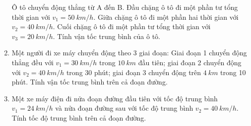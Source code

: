 \begin{enumerate}[label=\bfseries Câu \arabic*:]
	{
		Ô tô chuyển động thẳng từ A đến B. Đầu chặng ô tô đi một phần tư tổng thời gian với $v_1 = \SI{50}{km/h}$. Giữa chặng ô tô đi một phần hai thời gian với $v_2 = \SI{40}{km/h}$. Cuối chặng ô tô đi một phần tư tổng thời gian với $v_3 = \SI{20}{km/h}$. Tính vận tốc trung bình của ô tô.
	}


		\item {}
	
	{
		
		 Một người đi xe máy chuyển động theo 3 giai đoạn: Giai đoạn 1 chuyển động thẳng đều với 
		$v_1 = \SI{30}{km/h}$ trong $\SI{10}{km}$ đầu tiên; giai đoạn 2 chuyển động với $v_2 = \SI{40}{km/h}$ trong 30 phút; giai đoạn 3 chuyển động trên $\SI{4}{km}$ trong 10 phút. Tính vận tốc trung bình trên cả đoạn đường.
	}
			\item {}
	
	{
		Một xe máy điện đi nửa đoạn đường đầu tiên với tốc độ trung bình $v_1 = \SI{24}{km/h}$ và nửa đoạn đường sau với tốc độ trung bình $v_2 = \SI{40}{km/h}$. Tính tốc độ trung bình trên cả đoạn đường.
		
}
\end{enumerate}
